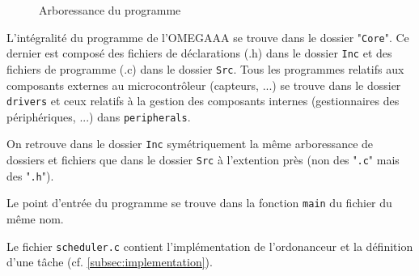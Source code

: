 \begin{minipage}{0.95\textwidth}
    \begin{wrapfigure}{L}{0.35\textwidth}
    \vspace{-1.0cm}
    \caption{Arboressance du programme}
    \end{wrapfigure}
    
    \vspace{1.0cm}
    
    L'intégralité du programme de l'OMEGAAA se trouve dans le dossier
    "\texttt{Core}". Ce dernier est composé des fichiers de déclarations (.h) dans
    le dossier \texttt{Inc} et des fichiers de programme (.c) dans le dossier
    \texttt{Src}. Tous     les programmes relatifs aux composants externes au
    microcontrôleur (capteurs, ...) se trouve dans le dossier \texttt{drivers} et
    ceux relatifs à la gestion des composants internes (gestionnaires des
    périphériques, ...) dans \texttt{peripherals}.
    
    \vspace{0.5cm}
    
    On retrouve dans le dossier \texttt{Inc} symétriquement la même arboressance de
    dossiers et fichiers que dans le dossier \texttt{Src} à l'extention près (non
    des "\texttt{.c}" mais des "\texttt{.h}").
    
    \vspace{0.5cm}
    
    Le point d'entrée du programme se trouve dans la fonction \texttt{main} du
    fichier du même nom.
    
    
    \vspace{0.2cm}
    Le fichier \texttt{scheduler.c} contient l'implémentation de l'ordonanceur et
    la définition d'une tâche (cf. \ref{subsec:implementation}).


\end{minipage}
